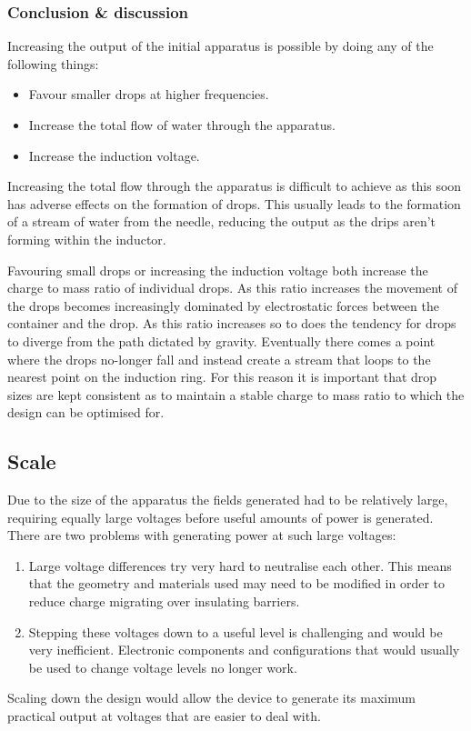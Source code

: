 \subsubsection*{Conclusion \& discussion}

Increasing the output of the initial apparatus is possible by doing
any of the following things:
\begin{itemize}
\item Favour smaller drops at higher frequencies.
\item Increase the total flow of water through the apparatus.
\item Increase the induction voltage.
\end{itemize}
Increasing the total flow through the apparatus is difficult to achieve
as this soon has adverse effects on the formation of drops. This usually
leads to the formation of a stream of water from the needle, reducing
the output as the drips aren't forming within the inductor.

Favouring small drops or increasing the induction voltage both increase
the charge to mass ratio of individual drops. As this ratio increases
the movement of the drops becomes increasingly dominated by electrostatic
forces between the container and the drop. As this ratio increases
so to does the tendency for drops to diverge from the path dictated
by gravity. Eventually there comes a point where the drops no-longer
fall and instead create a stream that loops to the nearest point on
the induction ring. For this reason it is important that drop sizes
are kept consistent as to maintain a stable charge to mass ratio to
which the design can be optimised for.


\subsection*{Scale}

Due to the size of the apparatus the fields generated had to be relatively
large, requiring equally large voltages before useful amounts of power
is generated. There are two problems with generating power at such
large voltages:
\begin{enumerate}
\item Large voltage differences try very hard to neutralise each other.
This means that the geometry and materials used may need to be modified
in order to reduce charge migrating over insulating barriers.
\item Stepping these voltages down to a useful level is challenging and
would be very inefficient. Electronic components and configurations
that would usually be used to change voltage levels no longer work.
\end{enumerate}
Scaling down the design would allow the device to generate its maximum
practical output at voltages that are easier to deal with.


